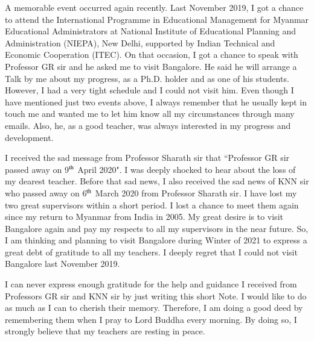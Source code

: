 A memorable event occurred again recently. Last November 2019, I got a chance to attend the International Programme in Educational Management for Myanmar Educational Administrators at National Institute of Educational Planning and Administration (NIEPA), New Delhi, supported by Indian Technical and Economic Cooperation (ITEC). On that occasion, I got a chance to speak with Professor GR sir and he asked me to visit Bangalore. He said he will arrange a Talk by me about my progress, as a Ph.D. holder and as one of his students. However, I had a very tight schedule and I could not visit him. Even though I have mentioned just two events above, I always remember that he usually kept in touch me and wanted me to let him know all my circumstances through many emails. Also, he, as a good teacher, was always interested in my progress and development. 

I received the sad message from Professor Sharath sir that ``Professor GR sir passed away on 9$^{\rm th}$ April 2020". I was deeply shocked to hear about the loss of my dearest teacher. Before that sad news, I also received the sad news of KNN sir who passed away on 6$^{\rm th}$ March 2020 from Professor Sharath sir. I have lost my two great supervisors within a short period. I lost a chance to meet them again since my return to Myanmar from India in 2005. My great desire is to visit Bangalore again and pay my respects to all my supervisors in the near future. So, I am thinking and planning to visit Bangalore during Winter of 2021 to express a great debt of gratitude to all my teachers. I deeply regret that I could not visit Bangalore last November 2019. 

I can never express enough gratitude for the help and guidance I received from Professors GR sir and KNN sir by just writing this short Note. I would like to do as much as I can to cherish their memory. Therefore, I am doing a good deed by remembering them when I pray to Lord Buddha every morning. By doing so, I strongly believe that my teachers are resting in peace. 
\vspace{1cm}

